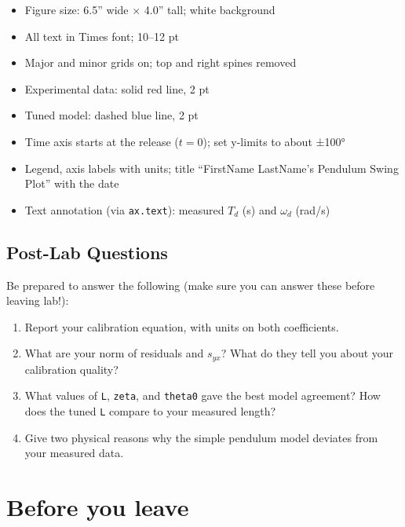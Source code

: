 \documentclass[
  12pt,
  letterpaper,
]{article}
\providecommand{\tightlist}{%
  \setlength{\itemsep}{0pt}\setlength{\parskip}{0pt}}
\begin{document}
\begin{itemize}
\tightlist
\item
  Figure size: 6.5'' wide × 4.0'' tall; white background
\item
  All text in Times font; 10--12 pt
\item
  Major and minor grids on; top and right spines removed
\item
  Experimental data: solid red line, 2 pt
\item
  Tuned model: dashed blue line, 2 pt
\item
  Time axis starts at the release (\(t = 0\)); set y-limits to about
  ±100°
\item
  Legend, axis labels with units; title ``FirstName LastName's Pendulum
  Swing Plot'' with the date
\item
  Text annotation (via \texttt{ax.text}): measured \(T_d\) (s) and
  \(\omega_d\) (rad/s)
\end{itemize}

\subsection{Post-Lab Questions}\label{post-lab-questions}

Be prepared to answer the following (make sure you can answer these
before leaving lab!):

\begin{enumerate}
\def\labelenumi{\arabic{enumi}.}
\tightlist
\item
  Report your calibration equation, with units on both coefficients.
\item
  What are your norm of residuals and \(s_{yx}\)? What do they tell you
  about your calibration quality?
\item
  What values of \texttt{L}, \texttt{zeta}, and \texttt{theta0} gave the
  best model agreement? How does the tuned \texttt{L} compare to your
  measured length?
\item
  Give two physical reasons why the simple pendulum model deviates from
  your measured data.
\end{enumerate}

\section{Before you leave}\label{before-you-leave}
\end{document}
